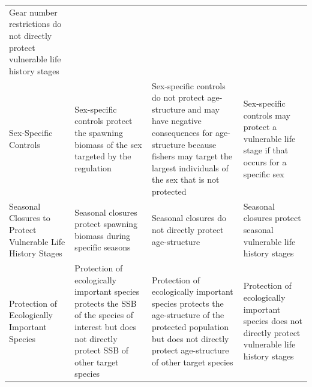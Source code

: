 \documentclass[]{book}
\begin{document}
\begin{longtable}[]{@{}llll@{}}
\begin{minipage}[t]{0.22\columnwidth}
Gear number restrictions do not directly protect vulnerable life history
stages\strut
\end{minipage}\tabularnewline
\begin{minipage}[t]{0.22\columnwidth}\raggedright\strut
Sex-Specific Controls\strut
\end{minipage} & \begin{minipage}[t]{0.22\columnwidth}\raggedright\strut
Sex-specific controls protect the spawning biomass of the sex targeted
by the regulation\strut
\end{minipage} & \begin{minipage}[t]{0.22\columnwidth}\raggedright\strut
Sex-specific controls do not protect age-structure and may have negative
consequences for age-structure because fishers may target the largest
individuals of the sex that is not protected\strut
\end{minipage} & \begin{minipage}[t]{0.22\columnwidth}\raggedright\strut
Sex-specific controls may protect a vulnerable life stage if that occurs
for a specific sex\strut
\end{minipage}\tabularnewline
\begin{minipage}[t]{0.22\columnwidth}\raggedright\strut
Seasonal Closures to Protect Vulnerable Life History Stages\strut
\end{minipage} & \begin{minipage}[t]{0.22\columnwidth}\raggedright\strut
Seasonal closures protect spawning biomass during specific seasons\strut
\end{minipage} & \begin{minipage}[t]{0.22\columnwidth}\raggedright\strut
Seasonal closures do not directly protect age-structure\strut
\end{minipage} & \begin{minipage}[t]{0.22\columnwidth}\raggedright\strut
Seasonal closures protect seasonal vulnerable life history stages\strut
\end{minipage}\tabularnewline
\begin{minipage}[t]{0.22\columnwidth}\raggedright\strut
Protection of Ecologically Important Species\strut
\end{minipage} & \begin{minipage}[t]{0.22\columnwidth}\raggedright\strut
Protection of ecologically important species protects the SSB of the
species of interest but does not directly protect SSB of other target
species\strut
\end{minipage} & \begin{minipage}[t]{0.22\columnwidth}\raggedright\strut
Protection of ecologically important species protects the age-structure
of the protected population but does not directly protect age-structure
of other target species\strut
\end{minipage} & \begin{minipage}[t]{0.22\columnwidth}\raggedright\strut
Protection of ecologically important species does not directly protect
vulnerable life history stages\strut
\end{minipage}\tabularnewline
\bottomrule
\end{longtable}
\end{document}
